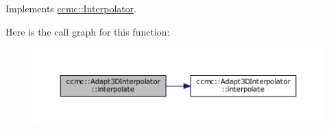 Implements \hyperlink{classccmc_1_1_interpolator_a6bfe1b4075f03704b893bb96e1675a3b}{ccmc\-::\-Interpolator}.



Here is the call graph for this function\-:\nopagebreak
\begin{figure}[H]
\begin{center}
\leavevmode
\includegraphics[width=350pt]{classccmc_1_1_adapt3_d_interpolator_ad6f6e98e2070f7bf9f99be40c127548f_cgraph}
\end{center}
\end{figure}


